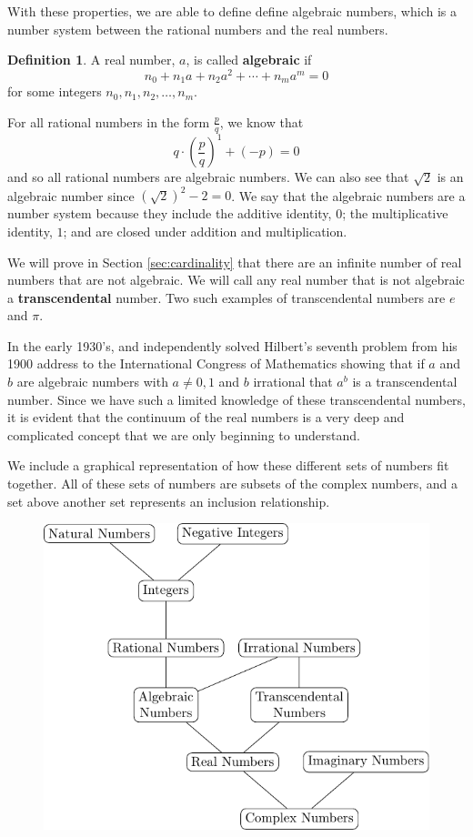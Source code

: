 \documentclass[
]{book}
\theoremstyle{definition}
\newtheorem{definition}{Definition}[chapter]
\theoremstyle{definition}
\theoremstyle{definition}
\theoremstyle{remark}
\begin{document}
With these properties, we are able to define define algebraic numbers, which is a number system between the rational numbers and the real numbers.

\begin{definition}
\protect\hypertarget{def:unnamed-chunk-119}{}{\label{def:unnamed-chunk-119} }A real number, \(a\), is called \textbf{algebraic} if \[n_0 + n_1 a + n_2 a^2 + \cdots + n_m a^m =0\] for some integers \(n_0, n_1, n_2, \ldots, n_m\).
\end{definition}

For all rational numbers in the form \(\frac{p}{q}\), we know that \[q \cdot \left(\frac{p}{q}\right)^1 + (-p) = 0\] and so all rational numbers are algebraic numbers. We can also see that \(\sqrt{2}\) is an algebraic number since \((\sqrt{2})^2-2=0\). We say that the algebraic numbers are a number system because they include the additive identity, \(0\); the multiplicative identity, \(1\); and are closed under addition and multiplication.

We will prove in Section \ref{sec:cardinality} that there are an infinite number of real numbers that are not algebraic. We will call any real number that is not algebraic a \textbf{transcendental} number. Two such examples of transcendental numbers are \(e\) and \(\pi\).

In the early 1930's, \citet{Gelfond} and \citet{Schneider} independently solved Hilbert's seventh problem from his 1900 address to the International Congress of Mathematics showing that if \(a\) and \(b\) are algebraic numbers with \(a\neq 0,1\) and \(b\) irrational that \(a^b\) is a transcendental number. Since we have such a limited knowledge of these transcendental numbers, it is evident that the continuum of the real numbers is a very deep and complicated concept that we are only beginning to understand.

We include a graphical representation of how these different sets of numbers fit together. All of these sets of numbers are subsets of the complex numbers, and a set above another set represents an inclusion relationship.

\begin{figure}

{\centering \includegraphics[width=0.6\linewidth]{tikz/NumberTree} 

}

\end{figure}
\end{document}
